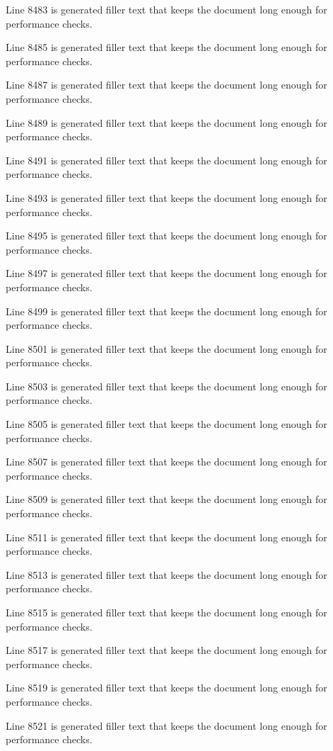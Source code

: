 Line 8483 is generated filler text that keeps the document long enough for performance checks.

Line 8485 is generated filler text that keeps the document long enough for performance checks.

Line 8487 is generated filler text that keeps the document long enough for performance checks.

Line 8489 is generated filler text that keeps the document long enough for performance checks.

Line 8491 is generated filler text that keeps the document long enough for performance checks.

Line 8493 is generated filler text that keeps the document long enough for performance checks.

Line 8495 is generated filler text that keeps the document long enough for performance checks.

Line 8497 is generated filler text that keeps the document long enough for performance checks.

Line 8499 is generated filler text that keeps the document long enough for performance checks.

Line 8501 is generated filler text that keeps the document long enough for performance checks.

Line 8503 is generated filler text that keeps the document long enough for performance checks.

Line 8505 is generated filler text that keeps the document long enough for performance checks.

Line 8507 is generated filler text that keeps the document long enough for performance checks.

Line 8509 is generated filler text that keeps the document long enough for performance checks.

Line 8511 is generated filler text that keeps the document long enough for performance checks.

Line 8513 is generated filler text that keeps the document long enough for performance checks.

Line 8515 is generated filler text that keeps the document long enough for performance checks.

Line 8517 is generated filler text that keeps the document long enough for performance checks.

Line 8519 is generated filler text that keeps the document long enough for performance checks.

Line 8521 is generated filler text that keeps the document long enough for performance checks.

